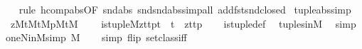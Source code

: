 \begin{isabellebody}
\ \ \isamarkupfalse%
\ {\isacharparenleft}{\kern0pt}rule\ hcomp{\isacharunderscore}{\kern0pt}abs{\isacharbrackleft}{\kern0pt}OF\ snd{\isacharunderscore}{\kern0pt}abs\ snd{\isacharunderscore}{\kern0pt}snd{\isacharunderscore}{\kern0pt}abs{\isacharbrackright}{\kern0pt}{\isacharsemicolon}{\kern0pt}simp{\isacharunderscore}{\kern0pt}all\ add{\isacharcolon}{\kern0pt}fst{\isacharunderscore}{\kern0pt}snd{\isacharunderscore}{\kern0pt}closed{\isacharparenright}{\kern0pt}%
\endisatagproof
{\isafoldproof}%
%
\isadelimproof
\isanewline
%
\endisadelimproof
\isanewline
{}\isamarkupfalse%
\ tuple{\isacharunderscore}{\kern0pt}abs{\isacharbrackleft}{\kern0pt}simp{\isacharbrackright}{\kern0pt}{\isacharcolon}{\kern0pt}\isanewline
\ \ {\isachardoublequoteopen}{\isasymlbrakk}z{\isasymin}M{\isacharsemicolon}{\kern0pt}t{}{\isasymin}M{\isacharsemicolon}{\kern0pt}t{}{\isasymin}M{\isacharsemicolon}{\kern0pt}p{\isasymin}M{\isacharsemicolon}{\kern0pt}t{\isasymin}M{\isasymrbrakk}\ {\isasymLongrightarrow}\isanewline
\ \ \ is{\isacharunderscore}{\kern0pt}tuple{\isacharparenleft}{\kern0pt}{\isacharhash}{\kern0pt}{\isacharhash}{\kern0pt}M{\isacharcomma}{\kern0pt}z{\isacharcomma}{\kern0pt}t{}{\isacharcomma}{\kern0pt}t{}{\isacharcomma}{\kern0pt}p{\isacharcomma}{\kern0pt}t{\isacharparenright}{\kern0pt}\ {\isasymlongleftrightarrow}\ t\ {\isacharequal}{\kern0pt}\ {\isasymlangle}z{\isacharcomma}{\kern0pt}t{}{\isacharcomma}{\kern0pt}t{}{\isacharcomma}{\kern0pt}p{\isasymrangle}{\isachardoublequoteclose}\isanewline
%
\isadelimproof
\ \ %
\endisadelimproof
%
\isatagproof
{}\isamarkupfalse%
\ is{\isacharunderscore}{\kern0pt}tuple{\isacharunderscore}{\kern0pt}def\ \isamarkupfalse%
\ tuples{\isacharunderscore}{\kern0pt}in{\isacharunderscore}{\kern0pt}M\ \isamarkupfalse%
\ simp%
\endisatagproof
{\isafoldproof}%
%
\isadelimproof
\isanewline
%
\endisadelimproof
\isanewline
{}\isamarkupfalse%
\ oneN{\isacharunderscore}{\kern0pt}in{\isacharunderscore}{\kern0pt}M{\isacharbrackleft}{\kern0pt}simp{\isacharbrackright}{\kern0pt}{\isacharcolon}{\kern0pt}\ {\isachardoublequoteopen}{}{\isasymin}M{\isachardoublequoteclose}\isanewline
%
\isadelimproof
\ \ %
\endisadelimproof
%
\isatagproof
{}\isamarkupfalse%
\ {\isacharparenleft}{\kern0pt}simp\ flip{\isacharcolon}{\kern0pt}\ setclass{\isacharunderscore}{\kern0pt}iff{\isacharparenright}{\kern0pt}%
\endisatagproof
{\isafoldproof}%
%
\isadelimproof
\isanewline
%
\endisadelimproof

\end{isabellebody}
